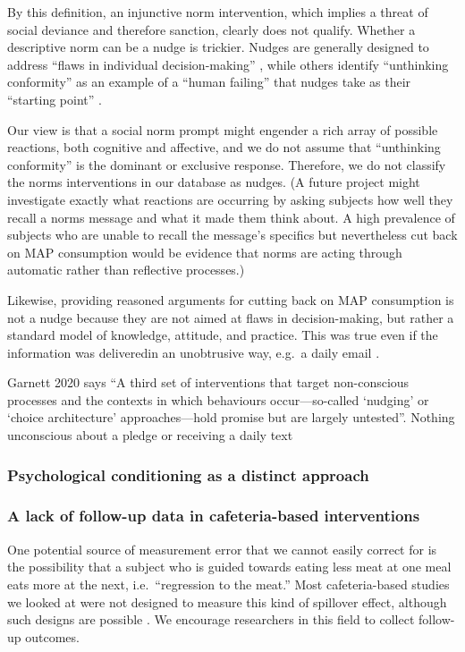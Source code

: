 \documentclass[sn-nature,pdflatex]{sn-jnl}
\begin{document}
By this definition, an injunctive norm intervention, which implies a
threat of social deviance and therefore sanction, clearly does not
qualify. Whether a descriptive norm can be a nudge is trickier. Nudges
are generally designed to address ``flaws in individual
decision-making'' \citep[126]{hausman2010}, while others identify
``unthinking conformity'' as an example of a ``human failing'' that
nudges take as their ``starting point'' \citep[4]{mols2015}.

Our view is that a social norm prompt might engender a rich array of
possible reactions, both cognitive and affective, and we do not assume
that ``unthinking conformity'' is the dominant or exclusive response.
Therefore, we do not classify the norms interventions in our database as
nudges. (A future project might investigate exactly what reactions are
occurring by asking subjects how well they recall a norms message and
what it made them think about. A high prevalence of subjects who are
unable to recall the message's specifics but nevertheless cut back on
MAP consumption would be evidence that norms are acting through
automatic rather than reflective processes.)

Likewise, providing reasoned arguments for cutting back on MAP
consumption is not a nudge because they are not aimed at flaws in
decision-making, but rather a standard model of knowledge, attitude, and
practice. This was true even if the information was deliveredin an
unobtrusive way, e.g.~a daily email \citep{banerjee2019}.

Garnett 2020 says ``A third set of interventions that target
non-conscious processes and the contexts in which behaviours
occur---so-called `nudging' or `choice architecture' approaches---hold
promise but are largely untested''. Nothing unconscious about a pledge
or receiving a daily text

\subsubsection{Psychological conditioning as a distinct
approach}\label{psychological-conditioning-as-a-distinct-approach}

\subsubsection{A lack of follow-up data in cafeteria-based
interventions}\label{a-lack-of-follow-up-data-in-cafeteria-based-interventions}

One potential source of measurement error that we cannot easily correct
for is the possibility that a subject who is guided towards eating less
meat at one meal eats more at the next, i.e.~``regression to the meat.''
Most cafeteria-based studies we looked at were not designed to measure
this kind of spillover effect, although such designs are possible
\citep{vocski2024}. We encourage researchers in this field to collect
follow-up outcomes.
\end{document}
